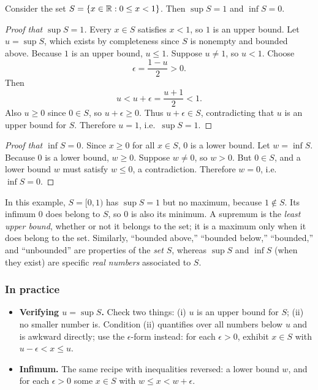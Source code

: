 \begin{example}
    Consider the set $S = \left\{x \in \mathbb{R} : 0 \leq x < 1\right\}$. Then $\sup S = 1$ and $\inf S = 0$.
\end{example}

\begin{proof}[Proof that $\sup S=1$]
    Every $x\in S$ satisfies $x<1$, so $1$ is an upper bound. Let $u=\sup S$, which exists by completeness since $S$ is nonempty and bounded above. Because $1$ is an upper bound, $u\leq1$. Suppose $u\neq1$, so $u<1$. Choose
    \begin{equation*}
        \epsilon=\frac{1-u}{2}>0.
    \end{equation*}
    Then
    \begin{equation*}
        u<u+\epsilon=\frac{u+1}{2}<1.
    \end{equation*}
    Also $u\geq0$ since $0\in S$, so $u+\epsilon\geq0$. Thus $u+\epsilon\in S$, contradicting that $u$ is an upper bound for $S$. Therefore $u=1$, i.e.\ $\sup S=1$.
\end{proof}

\begin{proof}[Proof that $\inf S=0$]
    Since $x\geq0$ for all $x\in S$, $0$ is a lower bound. Let $w=\inf S$. Because $0$ is a lower bound, $w\geq0$. Suppose $w\neq0$, so $w>0$. But $0\in S$, and a lower bound $w$ must satisfy $w\leq0$, a contradiction. Therefore $w=0$, i.e.\ $\inf S=0$.
\end{proof}

\begin{remark}
    In this example, $S=[0,1)$ has $\sup S=1$ but no maximum, because $1\notin S$. Its infimum $0$ does belong to $S$, so $0$ is also its minimum. A supremum is the \emph{least upper bound}, whether or not it belongs to the set; it is a maximum only when it does belong to the set. Similarly, ``bounded above,'' ``bounded below,'' ``bounded,'' and ``unbounded'' are properties of the \emph{set} $S$, whereas $\sup S$ and $\inf S$ (when they exist) are specific \emph{real numbers} associated to $S$.
\end{remark}

\subsubsection*{In practice}
\begin{itemize}
    \item \textbf{Verifying $u=\sup S$.} Check two things: (i) $u$ is an upper bound for $S$; (ii) no smaller number is. Condition (ii) quantifies over all numbers below $u$ and is awkward directly; use the $\epsilon$-form instead: for each $\epsilon>0$, exhibit $x\in S$ with $u-\epsilon<x\leq u$.
    \item \textbf{Infimum.} The same recipe with inequalities reversed: a lower bound $w$, and for each $\epsilon>0$ some $x\in S$ with $w\leq x<w+\epsilon$.
\end{itemize}
